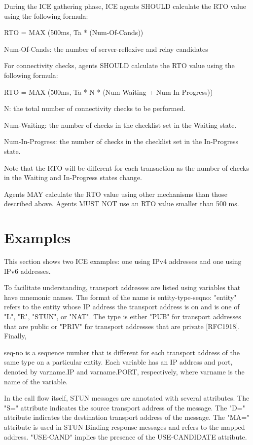 \documentclass{article}
\begin{document}
During the ICE gathering phase, ICE agents SHOULD calculate the RTO value using the following formula:

RTO = MAX (500ms, Ta * (Num-Of-Cands))

Num-Of-Cands: the number of server-reflexive and relay candidates

For connectivity checks, agents SHOULD calculate the RTO value using the following formula:

RTO = MAX (500ms, Ta * N * (Num-Waiting + Num-In-Progress))

N: the total number of connectivity checks to be performed.

Num-Waiting: the number of checks in the checklist set in the Waiting state.

Num-In-Progress: the number of checks in the checklist set in the In-Progress state.

Note that the RTO will be different for each transaction as the number of checks in the Waiting and In-Progress states change.

Agents MAY calculate the RTO value using other mechanisms than those described above.  Agents MUST NOT use an RTO value smaller than 500 ms.

\section{Examples}

This section shows two ICE examples: one using IPv4 addresses and one using IPv6 addresses.

To facilitate understanding, transport addresses are listed using variables that have mnemonic names.  The format of the name is entity-type-seqno: "entity" refers to the entity whose IP address the transport address is on and is one of "L", "R", "STUN", or "NAT". The type is either "PUB" for transport addresses that are public or "PRIV" for transport addresses that are private [RFC1918].  Finally,

seq-no is a sequence number that is different for each transport address of the same type on a particular entity.  Each variable has an IP address and port, denoted by varname.IP and varname.PORT, respectively, where varname is the name of the variable.

In the call flow itself, STUN messages are annotated with several attributes.  The "S=" attribute indicates the source transport address of the message.  The "D=" attribute indicates the destination transport address of the message.  The "MA=" attribute is used in STUN Binding response messages and refers to the mapped address. "USE-CAND" implies the presence of the USE-CANDIDATE attribute.
\end{document}
